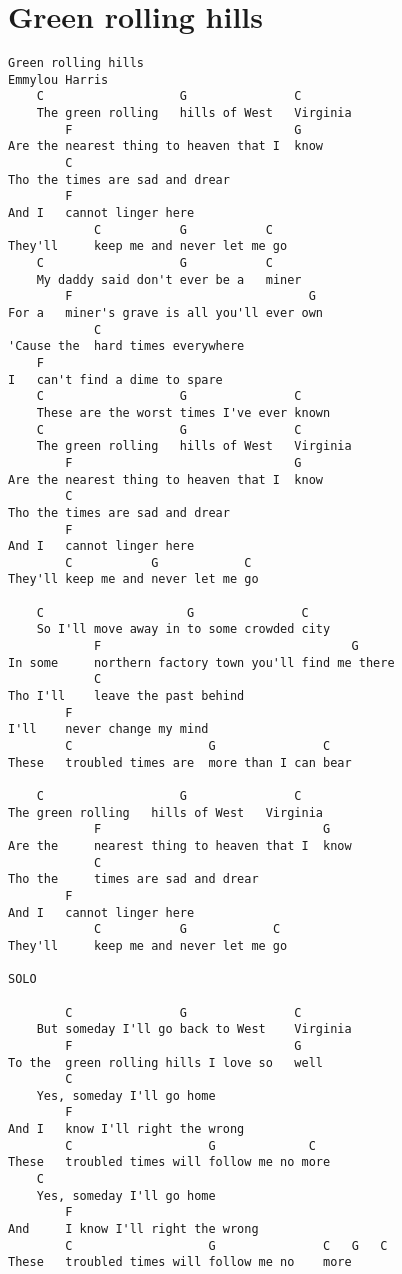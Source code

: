 \documentclass[leqno]{memoir}
\begin{document}
\chapter{Green rolling hills}
\begin{verbatim}
Green rolling hills
Emmylou Harris
    C                   G               C
    The green rolling   hills of West   Virginia
        F                               G
Are the nearest thing to heaven that I  know
        C
Tho the times are sad and drear
        F
And I   cannot linger here
            C           G           C
They'll     keep me and never let me go
    C                   G           C
    My daddy said don't ever be a   miner
        F                                 G
For a   miner's grave is all you'll ever own
            C
'Cause the  hard times everywhere
    F
I   can't find a dime to spare
    C                   G               C
    These are the worst times I've ever known
    C                   G               C
    The green rolling   hills of West   Virginia
        F                               G
Are the nearest thing to heaven that I  know
        C
Tho the times are sad and drear
        F
And I   cannot linger here
        C           G            C
They'll keep me and never let me go

    C                    G               C
    So I'll move away in to some crowded city
            F                                   G
In some     northern factory town you'll find me there
            C
Tho I'll    leave the past behind
        F
I'll    never change my mind
        C                   G               C
These   troubled times are  more than I can bear

    C                   G               C
The green rolling   hills of West   Virginia
            F                               G
Are the     nearest thing to heaven that I  know
            C
Tho the     times are sad and drear
        F
And I   cannot linger here
            C           G            C
They'll     keep me and never let me go

SOLO

        C               G               C
    But someday I'll go back to West    Virginia
        F                               G                       
To the  green rolling hills I love so   well
        C
    Yes, someday I'll go home
        F
And I   know I'll right the wrong
        C                   G             C
These   troubled times will follow me no more
    C
    Yes, someday I'll go home
        F
And     I know I'll right the wrong
        C                   G               C   G   C
These   troubled times will follow me no    more            
\end{verbatim}
\newpage
\end{document}
